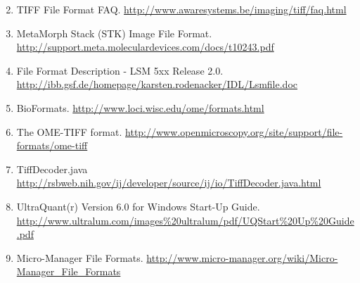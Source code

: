 \documentclass[letterpaper,10pt,english]{sphinxmanual}
\begin{document}
\begin{enumerate}
\setcounter{enumi}{1}
\item {} 
TIFF File Format FAQ. \href{http://www.awaresystems.be/imaging/tiff/faq.html}{http://www.awaresystems.be/imaging/tiff/faq.html}

\item {} 
MetaMorph Stack (STK) Image File Format.
\href{http://support.meta.moleculardevices.com/docs/t10243.pdf}{http://support.meta.moleculardevices.com/docs/t10243.pdf}

\item {} 
File Format Description - LSM 5xx Release 2.0.
\href{http://ibb.gsf.de/homepage/karsten.rodenacker/IDL/Lsmfile.doc}{http://ibb.gsf.de/homepage/karsten.rodenacker/IDL/Lsmfile.doc}

\item {} 
BioFormats. \href{http://www.loci.wisc.edu/ome/formats.html}{http://www.loci.wisc.edu/ome/formats.html}

\item {} 
The OME-TIFF format.
\href{http://www.openmicroscopy.org/site/support/file-formats/ome-tiff}{http://www.openmicroscopy.org/site/support/file-formats/ome-tiff}

\item {} 
TiffDecoder.java
\href{http://rsbweb.nih.gov/ij/developer/source/ij/io/TiffDecoder.java.html}{http://rsbweb.nih.gov/ij/developer/source/ij/io/TiffDecoder.java.html}

\item {} 
UltraQuant(r) Version 6.0 for Windows Start-Up Guide.
\href{http://www.ultralum.com/images\%20ultralum/pdf/UQStart\%20Up\%20Guide.pdf}{http://www.ultralum.com/images\%20ultralum/pdf/UQStart\%20Up\%20Guide.pdf}

\item {} 
Micro-Manager File Formats.
\href{http://www.micro-manager.org/wiki/Micro-Manager\_File\_Formats}{http://www.micro-manager.org/wiki/Micro-Manager\_File\_Formats}

\end{enumerate}
\end{document}
